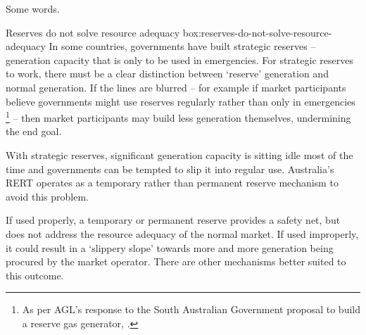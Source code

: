 \documentclass{article}
\begin{document}
Some words.


\begin{smallbox}{Reserves do not solve resource adequacy }{box:reserves-do-not-solve-resource-adequacy}
In some countries, governments have built strategic reserves -- generation capacity that is only to be used in emergencies. For strategic reserves to work, there must be a clear distinction between `reserve' generation and normal generation. If the lines are blurred -- for example if market participants believe governments might use reserves regularly rather than only in emergencies%
\footnote{As per AGL's response to the South Australian Government proposal to build a reserve gas generator, \textcite{MacdonaldSmith2017AGLshredsPlans}.}
-- then market participants may build less generation themselves, undermining the end goal.

With strategic reserves, significant generation capacity is sitting idle most of the time and governments can be tempted to slip it into regular use. Australia's RERT operates as a temporary rather than permanent reserve mechanism to avoid this problem.

If used properly, a temporary or permanent reserve provides a safety net, but does not address the resource adequacy of the normal market. If used improperly, it could result in a `slippery slope' towards more and more generation being procured by the market operator. There are other mechanisms better suited to this outcome. 
\end{smallbox}
\end{document}

